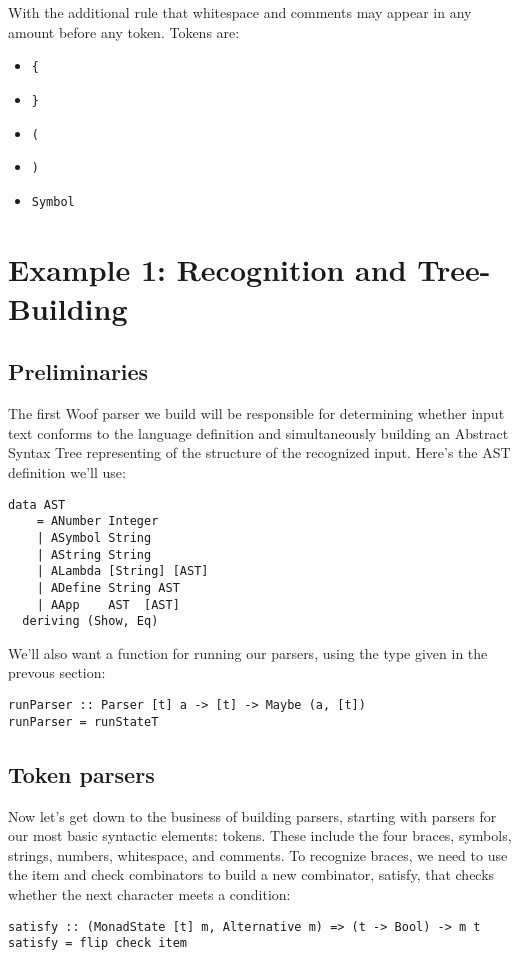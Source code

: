 \documentclass{tmr}
\begin{document}
With the additional rule that whitespace and comments may appear in any 
amount before any token.  Tokens are:
\begin{itemize}
\item \verb+{+
\item \verb+}+
\item \verb+(+
\item \verb+)+
\item \verb+Symbol+
\end{itemize}




\section{Example 1: Recognition and Tree-Building}

\subsection{Preliminaries}
The first Woof parser we build will be responsible for determining whether input
text conforms to the language definition and simultaneously building an 
Abstract Syntax Tree representing of the structure of the recognized input.
Here's the AST definition we'll use:
\begin{verbatim}
data AST
    = ANumber Integer
    | ASymbol String
    | AString String
    | ALambda [String] [AST]
    | ADefine String AST
    | AApp    AST  [AST]
  deriving (Show, Eq)
\end{verbatim}

We'll also want a function for running our parsers, using the type given in the
prevous section:
\begin{verbatim}
runParser :: Parser [t] a -> [t] -> Maybe (a, [t])
runParser = runStateT
\end{verbatim}

\subsection{Token parsers}
Now let's get down to the business of building parsers, starting with parsers
for our most basic syntactic elements:  tokens.
These include the four braces, symbols, strings, numbers, whitespace, and comments.
To recognize braces, we need to use the item and check combinators to build a new
 combinator, satisfy, that checks whether the next character meets a condition:
\begin{verbatim}
satisfy :: (MonadState [t] m, Alternative m) => (t -> Bool) -> m t
satisfy = flip check item
\end{verbatim}
\end{document}
